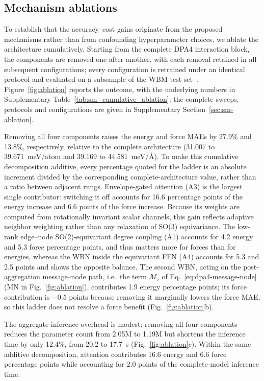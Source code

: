 \subsection{Mechanism ablations}
\label{sec:ablation}

To establish that the accuracy--cost gains originate from the proposed mechanisms rather than from confounding hyperparameter choices, we ablate the architecture cumulatively.
Starting from the complete DPA4 interaction block, the components are removed one after another, with each removal retained in all subsequent configurations; every configuration is retrained under an identical protocol and evaluated on a subsample of the WBM test set~\cite{WBM}.
Figure~\ref{fig:ablation} reports the outcome, with the underlying numbers in Supplementary Table~\ref{tab:sm_cumulative_ablation}; the complete sweeps, protocols and configurations are given in Supplementary Section~\ref{sec:sm-ablation}.

Removing all four components raises the energy and force MAEs by 27.9\% and 13.8\%, respectively, relative to the complete architecture (31.007 to 39.671~meV/atom and 39.169 to 44.581~meV/\AA{}).
To make this cumulative decomposition additive, every percentage quoted for the ladder is an absolute increment divided by the corresponding complete-architecture value, rather than a ratio between adjacent rungs.
Envelope-gated attention (A3) is the largest single contributor: switching it off accounts for 16.6 percentage points of the energy increase and 6.6 points of the force increase.
Because its weights are computed from rotationally invariant scalar channels, this gain reflects adaptive neighbor weighting rather than any relaxation of SO(3) equivariance.
The low-rank edge--node SO(2)-equivariant degree coupling (A1) accounts for 4.2 energy and 5.3 force percentage points, and thus matters more for forces than for energies, whereas the WBN inside the equivariant FFN (A4) accounts for 5.3 and 2.5 points and shows the opposite balance.
The second WBN, acting on the post-aggregation message--node path, i.e.\ the term $\mathcal{M}_i$ of Eq.~\eqref{eq:dpa4-message-node} (MN in Fig.~\ref{fig:ablation}), contributes 1.9 energy percentage points; its force contribution is $-0.5$ points because removing it marginally lowers the force MAE, so this ladder does not resolve a force benefit (Fig.~\ref{fig:ablation}b).

The aggregate inference overhead is modest: removing all four components reduces the parameter count from 2.05M to 1.19M but shortens the inference time by only 12.4\%, from 20.2 to 17.7~s (Fig.~\ref{fig:ablation}c).
Within the same additive decomposition, attention contributes 16.6 energy and 6.6 force percentage points while accounting for 2.0 points of the complete-model inference time.

